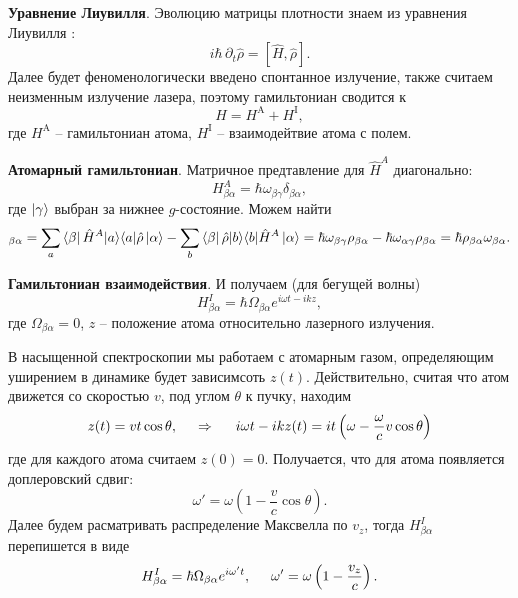 \textbf{Уравнение Лиувилля}. 
Эволюцию матрицы плотности знаем из уравнения Лиувилля \cite{mandel_wolf_1995}:
\begin{equation}
    i \hbar\, \partial_t \hat{\rho} = [\hat{H}, \hat{\rho}].
    \label{master_eq}
\end{equation}
Далее будет феноменологически введено спонтанное излучение, также считаем неизменным излучение лазера, поэтому гамильтониан сводится к
\begin{equation*}
    H = H^{\text{A}} + H^{\text{I}},
\end{equation*}
где $H^{\text{A}}$ -- гамильтониан атома, $H^{\text{I}}$ -- взаимодейтвие атома с полем.



\textbf{Атомарный гамильтониан}. Матричное предтавление для $\hat{H}^A$ диагонально:
\begin{equation*}
    H^A_{\beta \alpha} = \hbar \omega_{\beta \gamma} \delta_{\beta \alpha},
\end{equation*}
где $\left| \gamma \right\rangle$ выбран за нижнее $g$-состояние. Можем найти
\begin{equation*}
    [H^A,\, \hat{\rho}]_{\beta\alpha} = \sum_{a} \bra{\beta} \hat{H}^A \kb{a}{a} \hat{\rho} \ket{\alpha} - \sum_b \bra{\beta} \hat{\rho} \kb{b}{b} \hat{H}^A \ket{\alpha} = \hbar \omega_{\beta \gamma} \rho_{\beta \alpha} - \hbar \omega_{\alpha \gamma} \rho_{\beta \alpha} = \hbar \rho_{\beta \alpha} \omega_{\beta \alpha}.
\end{equation*}


\textbf{Гамильтониан взаимодействия}.  И получаем (для бегущей волны)
\begin{equation*}
    H^I_{\beta \alpha} = \hbar \Omega_{\beta \alpha} e^{i \omega t - i k z},
\end{equation*}
где $\Omega_{\beta \alpha} = 0$, $z$ -- положение атома относительно лазерного излучения.

В насыщенной спектроскопии мы работаем с атомарным газом, определяющим уширением в динамике будет зависимсоть $z(t)$. Действительно, считая что атом движется со скоростью $v$, под углом $\theta$ к пучку, находим
\begin{equation*}
    z(t) = v t \cos \theta,
    \hspace{0.5cm} \Rightarrow \hspace{0.5cm}
    i \omega t - i k z(t) = i t \left(\omega - \frac{\omega}{c} v \cos \theta\right)
\end{equation*}
где для каждого атома считаем $z(0)=0$. Получается, что для атома появляется доплеровский сдвиг:
\begin{equation*}
    \omega' = \omega \left(1 - \frac{v}{c}\cos \theta\right).
\end{equation*}
Далее будем расматривать распределение Максвелла по $v_z$, тогда $H^I_{\beta \alpha}$ перепишется в виде
\begin{equation*}
    H^I_{\beta \alpha} = \hbar \Omega_{\beta \alpha} e^{i \omega' t},
    \hspace{5 mm} 
    \omega' = \omega\left(1 - \frac{v_z}{c}\right).
\end{equation*}



